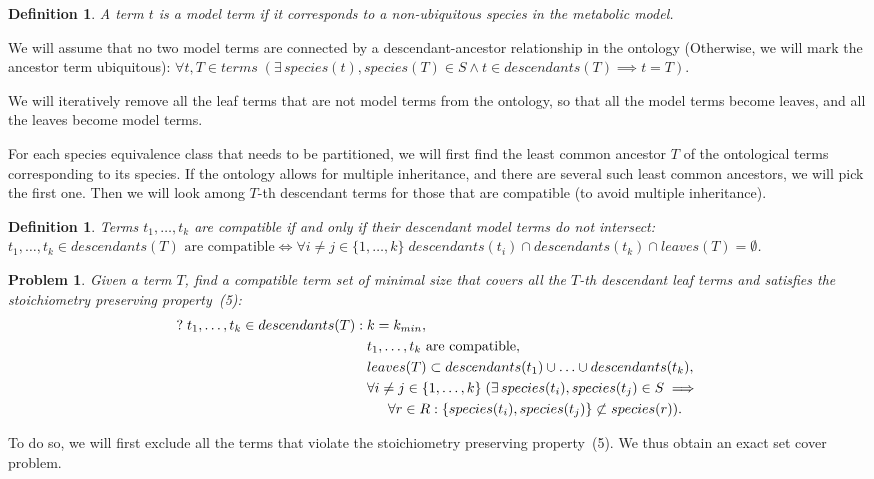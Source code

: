 \documentclass[10pt]{bmc_article}
\newenvironment{bmcformat}{\baselineskip20pt\sloppy\setboolean{publ}{false}}{\baselineskip20pt\sloppy}
\begin{document}
\begin{bmcformat}
\newtheorem{mt}{Definition}
\begin{mt}
A term $t$ is a model term if it corresponds to a non-ubiquitous species in the metabolic model. 
\end{mt}
We will assume that no two model terms are connected by a descendant-ancestor relationship in the ontology (Otherwise, we will mark the ancestor term ubiquitous): $\forall t, T \in terms \; (\exists\, species(t), species(T) \in S \land t \in descendants(T) \implies t = T)$.

We will iteratively remove all the leaf terms that are not model terms from the ontology, so that all the model terms become leaves, and all the leaves become model terms. 

For each species equivalence class that needs to be partitioned, we will first find the least common ancestor $T$ of the ontological terms corresponding to its species. If the ontology allows for multiple inheritance, and there are several such least common ancestors, we will pick the first one. Then we will look among $T$-th descendant terms for those that are compatible (to avoid multiple inheritance).

\newtheorem{comp}{Definition}
\begin{comp}
Terms $ t_1, \ldots, t_k$ are compatible if and only if their descendant model terms do not intersect:
$ t_1, \ldots, t_k \in descendants(T) \text{ are compatible} \iff \forall i \neq j \in \{1, \ldots, k\} \; descendants(t_i) \cap descendants(t_k) \cap leaves(T) = \emptyset$.
\end{comp}

\newtheorem{pp}{Problem}
\begin{pp}
Given a term $T$, find a compatible term set of minimal size that covers all the $T$-th descendant leaf terms and satisfies the stoichiometry preserving property~(5):
\begin{align}
\nonumber ?\; t_1, \ldots, t_k \in descendants(T):\; & k = k_{min},\\
&t_1, \ldots, t_k \text{ are compatible},\\
&leaves(T) \subset descendants(t_1) \cup \ldots \cup descendants(t_k) ,\\
&\forall i \neq j \in \{1, \ldots, k\}\; (\exists\, species(t_i), species(t_j) \in S \implies \\
\nonumber &\indent \forall r \in R: \{species(t_i), species(t_j)\} \not \subset species(r)).
\end{align}
\end{pp}
To do so, we will first exclude all the terms that violate the stoichiometry preserving property~(5). We thus obtain an exact set cover problem. 


\end{bmcformat}
\end{document}

